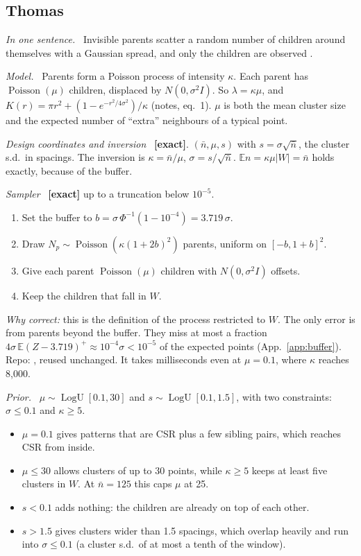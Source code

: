\documentclass[10pt,a4paper]{article}
\newcommand{\code}[1]{\texttt{\detokenize{#1}}}
\newcommand{\exact}{\textcolor{green!45!black}{\textbf{[exact]}}}
\newcommand{\nbar}{\bar n}
\newcommand{\LogU}{\operatorname{LogU}}
\newcommand{\Pois}{\operatorname{Poisson}}
\newcommand{\E}{\mathbb{E}}
\newcommand{\sub}[1]{\par\textit{#1}\ }
\begin{document}
\subsection{Thomas}
\sub{In one sentence.} Invisible parents scatter a random number of children around themselves with a Gaussian spread, and only the children are observed \citep{Thomas1949,NeymanScott1958}.
\sub{Model.} Parents form a Poisson process of intensity $\kappa$. Each parent has $\Pois(\mu)$ children, displaced by $N(0,\sigma^2I)$. So $\lambda=\kappa\mu$, and $K(r)=\pi r^2+(1-e^{-r^2/4\sigma^2})/\kappa$ (notes, eq.~1). $\mu$ is both the mean cluster size and the expected number of ``extra'' neighbours of a typical point.
\sub{Design coordinates and inversion} \exact. $(\nbar,\mu,s)$ with $s=\sigma\sqrt{\nbar}$, the cluster s.d.\ in spacings. The inversion is $\kappa=\nbar/\mu$, $\sigma=s/\sqrt{\nbar}$. $\E n=\kappa\mu|W|=\nbar$ holds exactly, because of the buffer.
\sub{Sampler} \exact{} up to a truncation below $10^{-5}$.
\begin{enumerate}
  \item Set the buffer to $b=\sigma\,\Phi^{-1}(1-10^{-4})=3.719\,\sigma$.
  \item Draw $N_p\sim\Pois(\kappa(1+2b)^2)$ parents, uniform on $[-b,1+b]^2$.
  \item Give each parent $\Pois(\mu)$ children with $N(0,\sigma^2I)$ offsets.
  \item Keep the children that fall in $W$.
\end{enumerate}
\emph{Why correct:} this is the definition of the process restricted to $W$. The only error is from parents beyond the buffer. They miss at most a fraction $4\sigma\,\E(Z-3.719)^+\approx10^{-4}\sigma<10^{-5}$ of the expected points (App.~\ref{app:buffer}). Repo: \code{neyman_scott.py}, reused unchanged. It takes milliseconds even at $\mu=0.1$, where $\kappa$ reaches 8{,}000.
\sub{Prior.} $\mu\sim\LogU[0.1,30]$ and $s\sim\LogU[0.1,1.5]$, with two constraints: $\sigma\le0.1$ and $\kappa\ge5$.
\begin{itemize}
  \item $\mu=0.1$ gives patterns that are CSR plus a few sibling pairs, which reaches CSR from inside.
  \item $\mu\le30$ allows clusters of up to 30 points, while $\kappa\ge5$ keeps at least five clusters in $W$. At $\nbar=125$ this caps $\mu$ at 25.
  \item $s<0.1$ adds nothing: the children are already on top of each other.
  \item $s>1.5$ gives clusters wider than 1.5 spacings, which overlap heavily and run into $\sigma\le0.1$ (a cluster s.d.\ of at most a tenth of the window).
\end{itemize}
\end{document}
